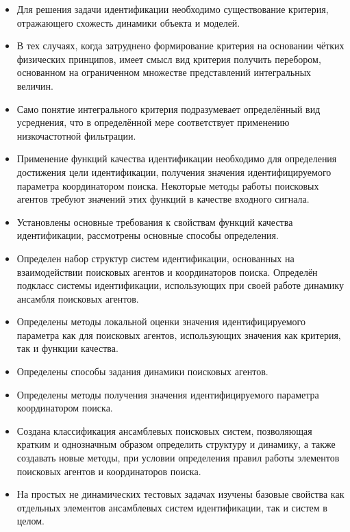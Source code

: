 \begin{itemize}

  \item
    Для решения задачи идентификации необходимо существование критерия,
    отражающего схожесть динамики объекта и моделей.

  \item
    В тех случаях, когда затруднено формирование критерия на основании чётких
    физических принципов, имеет смысл вид критерия получить перебором,
    основанном на ограниченном множестве представлений интегральных величин.

  \item
    Само понятие интегрального критерия подразумевает определённый вид усреднения,
    что в определённой мере соответствует применению низкочастотной фильтрации.

  \item
    Применение функций качества идентификации необходимо
    для определения достижения цели идентификации,
    получения значения идентифицируемого параметра координатором поиска.
    Некоторые методы работы поисковых агентов требуют значений
    этих функций в качестве входного сигнала.

  \item
    Установлены основные требования к свойствам функций качества идентификации,
    рассмотрены основные способы определения.

  \item
    Определен набор структур систем идентификации, основанных
    на взаимодействии поисковых агентов и координаторов поиска.
    Определён подкласс системы идентификации, использующих
    при своей работе динамику ансамбля поисковых агентов.

  \item
    Определены методы локальной оценки значения идентифицируемого параметра
    как для поисковых агентов, использующих значения как критерия,
    так и функции качества.

  \item
    Определены способы задания динамики поисковых агентов.

  \item
    Определены методы получения значения идентифицируемого параметра координатором поиска.

  \item
    Создана классификация ансамблевых поисковых систем, позволяющая
    кратким и однозначным образом определить структуру и динамику,
    а также создавать новые методы, при условии определения правил
    работы элементов поисковых агентов и координаторов поиска.

  \item
    На простых не динамических тестовых задачах
    изучены базовые свойства как отдельных элементов ансамблевых систем идентификации,
    так и систем в целом.


\end{itemize}

